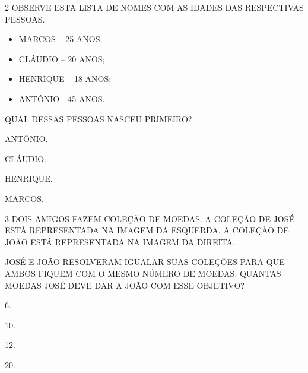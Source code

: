 \num{2} OBSERVE ESTA LISTA DE NOMES COM AS IDADES DAS RESPECTIVAS PESSOAS.

\begin{itemize}
  \item MARCOS -- 25 ANOS;
  \item CLÁUDIO -- 20 ANOS;
  \item HENRIQUE -- 18 ANOS;
  \item ANTÔNIO - 45 ANOS.
\end{itemize}

QUAL DESSAS PESSOAS NASCEU PRIMEIRO?

\begin{escolha}
\item ANTÔNIO.

\item CLÁUDIO.

\item HENRIQUE.

\item MARCOS.
\end{escolha}


\num{3} DOIS AMIGOS FAZEM COLEÇÃO DE MOEDAS. A COLEÇÃO DE JOSÉ ESTÁ REPRESENTADA NA IMAGEM DA
ESQUERDA. A COLEÇÃO DE JOÃO ESTÁ REPRESENTADA NA IMAGEM DA DIREITA.



JOSÉ E JOÃO RESOLVERAM IGUALAR SUAS COLEÇÕES PARA QUE AMBOS FIQUEM COM O MESMO NÚMERO DE MOEDAS. QUANTAS MOEDAS JOSÉ DEVE DAR A JOÃO COM ESSE OBJETIVO?

\begin{escolha}
\item 6.

\item 10.

\item 12.

\item 20.
\end{escolha}

